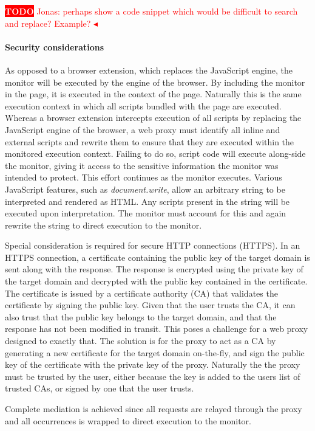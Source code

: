 \documentclass{llncs}
\newcommand{\todo}[1]{\colorbox{red}{\textcolor{white}{\sffamily\bfseries\scriptsize TODO}} \textcolor{red}{#1} \textcolor{red}{$\blacktriangleleft$}}
\begin{document}
\todo{Jonas: perhaps show a code snippet which would be difficult to search and replace? Example?}


\paragraph{Security considerations}

As opposed to a browser extension, which replaces the 
JavaScript engine, the monitor will be executed by the engine of the browser. 
By including the monitor in the page, it is executed in the context of the page. Naturally 
this is the same execution context in which all scripts bundled with the 
page are executed. Whereas a 
browser extension intercepts execution of all scripts by replacing the JavaScript 
engine of the browser, a web proxy must identify all inline and 
external scripts and rewrite them to ensure that they are executed within the 
monitored execution context. Failing to do so, script code will execute 
along-side the monitor, giving it access to the sensitive information the 
monitor was intended to protect. 
This effort continues as the monitor executes. Various JavaScript features, such as 
\emph{document.write}, allow an arbitrary string to be 
interpreted and rendered as HTML. Any scripts present in the string will be 
executed upon interpretation. The monitor must account for this and again rewrite 
the string to direct execution to the monitor.

Special consideration is required for secure HTTP connections (HTTPS). In an HTTPS 
connection, a certificate containing the public key of the target domain is sent 
along with the response. The response is encrypted using the private key of the target 
domain and decrypted with the public key contained in the certificate. The 
certificate is issued by a certificate authority (CA)
that validates the certificate by signing the public key. Given that the user 
trusts the CA, it can also trust that the public key belongs 
to the target domain, and that the response has not been modified in transit.
This poses a challenge for a web proxy designed to exactly that. The solution 
is for the proxy to act as a CA by generating a
new certificate for the target domain on-the-fly, and sign the 
public key of the certificate with the private key of the proxy. Naturally the 
the proxy must be trusted by the user, either because the key is added to 
the users list of trusted CAs, or signed by one that the user trusts.

Complete mediation is achieved since all requests are relayed through the proxy 
and all occurrences is wrapped to direct execution to the monitor.
\end{document}
